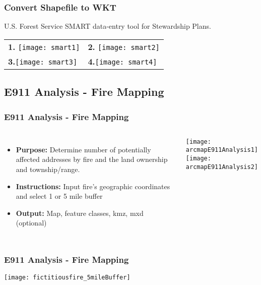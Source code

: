 \documentclass[t]{beamer} %
\begin{document}
\begin{frame}
\frametitle{Convert Shapefile to WKT}

U.S. Forest Service SMART data-entry tool for Stewardship Plans.
\vspace{-0.2in}
\begin{table}
\begin{tabular}{l l}
\textbf{1.} \texttt{[image: smart1]} & \textbf{2.} \texttt{[image: smart2]} \\
\textbf{3.}\texttt{[image: smart3]} & \textbf{4.}\texttt{[image: smart4]} \\
\end{tabular}
\end{table}
\end{frame}


\subsection{E911 Analysis - Fire Mapping}
\begin{frame}
\frametitle{E911 Analysis - Fire Mapping}

\begin{columns}[t]
\begin{itemize}
\item\textbf{Purpose: }Determine number of potentially affected addresses by fire and the land ownership and township/range.
\item\textbf{Instructions: }Input fire's geographic coordinates and select 1 or 5 mile buffer
\item\textbf{Output: }Map, feature classes, kmz, mxd (optional) 
\end{itemize}

\texttt{[image: arcmapE911Analysis1]}\\
\vspace{0.2in}
\texttt{[image: arcmapE911Analysis2]}
\end{columns}
\end{frame}


\begin{frame}
\frametitle{E911 Analysis - Fire Mapping}
\vspace{-0.4in}
\center
\texttt{[image: fictitiousfire\_5mileBuffer]}
\end{frame}
\end{document}
